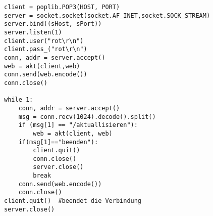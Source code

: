\documentclass[fleqn]{article}
\begin{document}
\begin{lstlisting}
client = poplib.POP3(HOST, PORT)
server = socket.socket(socket.AF_INET,socket.SOCK_STREAM)
server.bind((sHost, sPort))
server.listen(1)
client.user("rot\r\n")
client.pass_("rot\r\n")
conn, addr = server.accept()
web = akt(client,web)
conn.send(web.encode())
conn.close()

while 1:
    conn, addr = server.accept()
    msg = conn.recv(1024).decode().split()
    if (msg[1] == "/aktuallisieren"):
        web = akt(client, web)
    if(msg[1]=="beenden"):
        client.quit()
        conn.close()
        server.close()
        break
    conn.send(web.encode())
    conn.close()
client.quit()  #beendet die Verbindung
server.close()
\end{lstlisting}

\end{document}
